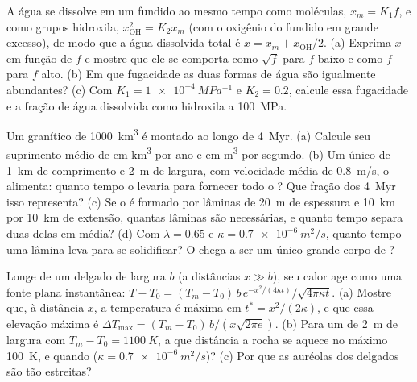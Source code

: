 \begin{exercise}[$\star\star\star$]\label{exo:b2:magma-emplacement:10}
A água se dissolve em um fundido ao mesmo tempo como moléculas, $x_m = K_1 f$, e como grupos
hidroxila, $x_{\mathrm{OH}}^2 = K_2 x_m$ (com o oxigênio do fundido em grande excesso), de modo
que a água dissolvida total é $x = x_m + x_{\mathrm{OH}}/2$. (a) Exprima $x$ em
função de $f$ e mostre que ele se comporta como $\sqrt f$ para $f$ baixo e como $f$ para
$f$ alto. (b) Em que fugacidade as duas formas de água são igualmente abundantes? (c)
Com $K_1 = \qty{1e-4}{MPa^{-1}}$ e $K_2 = 0.2$, calcule essa fugacidade e a
fração de água dissolvida como hidroxila a \qty{100}{MPa}.
\end{exercise}

\begin{exercise}[$\star\star\star$]\label{exo:b2:magma-emplacement:11}
Um  granítico de \qty{1000}{km^3} é montado ao longo de \qty{4}{Myr}. (a) Calcule
seu suprimento médio de  em \unit{km^3} por ano e em \unit{m^3} por segundo. (b) Um
único  de \qty{1}{km} de comprimento e \qty{2}{m} de largura, com velocidade média de
\qty{0.8}{m/s}, o alimenta: quanto tempo o  levaria para fornecer todo o
? Que fração dos \qty{4}{Myr} isso representa? (c) Se o  é formado por
lâminas de \qty{20}{m} de espessura e \qty{10}{km} por \qty{10}{km} de extensão, quantas lâminas
são necessárias, e quanto tempo separa duas delas em média? (d) Com
$\lambda = 0.65$ e $\kappa = \qty{0.7e-6}{m^2/s}$, quanto tempo uma lâmina leva para se
solidificar? O  chega a ser um único grande corpo de ?
\end{exercise}

\begin{exercise}[$\star\star\star$]\label{exo:b2:magma-emplacement:12}
Longe de um  delgado de largura $b$ (a distâncias $x \gg b$), seu calor age como uma
fonte plana instantânea: $T - T_0 = (T_m - T_0)\,b\,e^{-x^2/(4\kappa
t)}/\sqrt{4\pi\kappa t}$. (a) Mostre que, à distância $x$, a temperatura é máxima em
$t^* = x^2/(2\kappa)$, e que essa elevação máxima é $\Delta T_{\max} = (T_m -
T_0)\,b/(x\sqrt{2\pi e})$. (b) Para um  de \qty{2}{m} de largura com $T_m - T_0 =
\qty{1100}{K}$, a que distância a rocha se aquece no máximo \qty{100}{K}, e
quando ($\kappa = \qty{0.7e-6}{m^2/s}$)? (c) Por que as auréolas dos  delgados são tão
estreitas?
\end{exercise}


